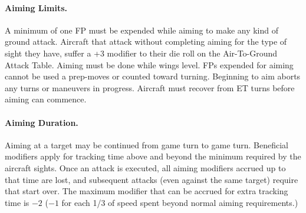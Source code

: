 
\paragraph{Aiming Limits.} A minimum of one FP must be expended while aiming to make any kind of ground attack. Aircraft that attack without completing aiming for the type of sight they have, suffer a +3 modifier to their die roll on the Air-To-Ground Attack Table. Aiming must be done while wings level. FPs expended for aiming cannot be used a prep-moves or counted toward turning. Beginning to aim aborts any turns or maneuvers in progress.  Aircraft must recover from ET turns before aiming can commence.

\paragraph{Aiming Duration.} Aiming at a target may be continued from game turn to game turn. Beneficial modifiers apply for tracking time above and beyond the minimum required by the aircraft sights. Once an attack is executed, all aiming modifiers accrued up to that time are lost, and subsequent attacks (even against the same target) require that start over. The maximum modifier that can be accrued for extra tracking time is $-2$ ($-1$ for each 1/3 of speed spent beyond normal aiming requirements.)

